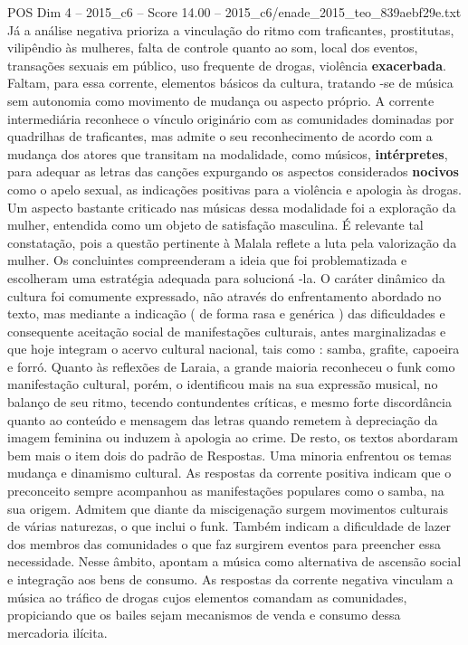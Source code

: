 \begin{textsample}{POS Dim 4 – 2015\_c6 – Score 14.00 – 2015\_c6/enade\_2015\_teo\_839aebf29e.txt}
Já a análise negativa prioriza a vinculação do ritmo com traficantes, prostitutas, vilipêndio às mulheres, falta de controle quanto ao som, local dos eventos, transações sexuais em público, uso frequente de drogas, violência \textbf{exacerbada}.
Faltam, para essa corrente, elementos básicos da cultura, tratando -se de música sem autonomia como movimento de mudança ou aspecto próprio.
A corrente intermediária reconhece o vínculo originário com as comunidades dominadas por quadrilhas de traficantes, mas admite o seu reconhecimento de acordo com a mudança dos atores que transitam na modalidade, como músicos, \textbf{intérpretes}, para adequar as letras das canções expurgando os aspectos considerados \textbf{nocivos} como o apelo sexual, as indicações positivas para a violência e apologia às drogas.
Um aspecto bastante criticado nas músicas dessa modalidade foi a exploração da mulher, entendida como um objeto de satisfação masculina.
É relevante tal constatação, pois a questão pertinente à Malala reflete a luta pela valorização da mulher.
Os concluintes compreenderam a ideia que foi problematizada e escolheram uma estratégia adequada para solucioná -la.
O caráter dinâmico da cultura foi comumente expressado, não através do enfrentamento abordado no texto, mas mediante a indicação ( de forma rasa e genérica ) das dificuldades e consequente aceitação social de manifestações culturais, antes marginalizadas e que hoje integram o acervo cultural nacional, tais como : samba, grafite, capoeira e forró.
Quanto às reflexões de Laraia, a grande maioria reconheceu o funk como manifestação cultural, porém, o identificou mais na sua expressão musical, no balanço de seu ritmo, tecendo contundentes críticas, e mesmo forte discordância quanto ao conteúdo e mensagem das letras quando remetem à depreciação da imagem feminina ou induzem à apologia ao crime.
De resto, os textos abordaram bem mais o item dois do padrão de Respostas.
Uma minoria enfrentou os temas mudança e dinamismo cultural.
As respostas da corrente positiva indicam que o preconceito sempre acompanhou as manifestações populares como o samba, na sua origem.
Admitem que diante da miscigenação surgem movimentos culturais de várias naturezas, o que inclui o funk.
Também indicam a dificuldade de lazer dos membros das comunidades o que faz surgirem eventos para preencher essa necessidade.
Nesse âmbito, apontam a música como alternativa de ascensão social e integração aos bens de consumo.
As respostas da corrente negativa vinculam a música ao tráfico de drogas cujos elementos comandam as comunidades, propiciando que os bailes sejam mecanismos de venda e consumo dessa mercadoria ilícita.

\end{textsample}

